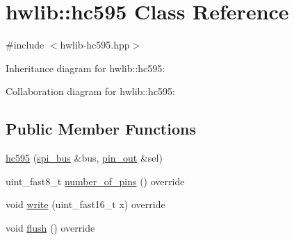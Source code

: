 \hypertarget{classhwlib_1_1hc595}{}\section{hwlib\+:\+:hc595 Class Reference}
\label{classhwlib_1_1hc595}


{\ttfamily \#include $<$hwlib-\/hc595.\+hpp$>$}



Inheritance diagram for hwlib\+:\+:hc595\+:


Collaboration diagram for hwlib\+:\+:hc595\+:
\subsection*{Public Member Functions}
\begin{DoxyCompactItemize}
\item 
\hyperlink{classhwlib_1_1hc595_a293236ae5bd14fa376d8b540324f07c0}{hc595} (\hyperlink{classhwlib_1_1spi__bus}{spi\+\_\+bus} \&bus, \hyperlink{classhwlib_1_1pin__out}{pin\+\_\+out} \&sel)
\item 
uint\+\_\+fast8\+\_\+t \hyperlink{classhwlib_1_1hc595_a89c7b21cb99d61c91f764a0fdb7ceb9b}{number\+\_\+of\+\_\+pins} () override
\item 
void \hyperlink{classhwlib_1_1hc595_a5cc052f6de8be418a6a3cb69919fd168}{write} (uint\+\_\+fast16\+\_\+t x) override
\item 
void \hyperlink{classhwlib_1_1hc595_a89801264883c79926fd9f0983662e50a}{flush} () override
\end{DoxyCompactItemize}
